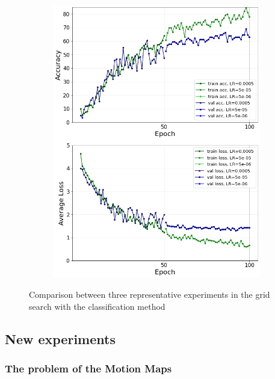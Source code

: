 \documentclass[10pt,twocolumn,hidelinks,letterpaper]{article}
\begin{document}
\begin{figure}
\begin{subfigure}{.325\linewidth}
  	\includegraphics[width=\linewidth]{images/grid_comparison/acc69lr5e-4step50100gamma01_no_reg.png}
  \end{subfigure}
  \caption{Comparison between three representative experiments in the grid search with the classification method}
  \label{grid_comparison}
\end{figure}

\subsection{New experiments}

\subsubsection{The problem of the Motion Maps}
\end{document}
